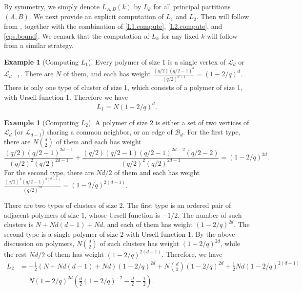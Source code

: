 \documentclass{amsart}
\theoremstyle{definition}
\newtheorem{example}[thm]{Example}
\newcommand{\cB}{\mathcal{B} }
\newcommand{\beq}[1]{\begin{equation}\label{#1}}
\newcommand{\enq}[0]{\end{equation}}
\newcommand{\0}[0]{\emptyset}
\begin{document}
By symmetry, we simply denote $L_{A, B}(k)$ by $L_k$ for all principal partitions $(A, B)$. We next provide an explicit computation of $L_1$ and $L_2$. Then  will follow from , together with the combination of \eqref{L1.compute}, \eqref{L2.compute}, and \eqref{eps.bound}. We remark that the computation of $L_k$ for any fixed $k$ will follow from a similar strategy.



\begin{example}[Computing $L_1$]
Every polymer of size 1 is a single vertex of $\mathcal{L}_d$ or $\mathcal{L}_{d-1}$. There are $N$ of them, and each has weight $\displaystyle \frac{(q/2)(q/2-1)^d}{(q/2)^{d+1}}=(1 - 2/q)^d$. There is only one type of cluster of size 1, which consists of a polymer of size 1, with Ursell function 1. Therefore we have 
\beq{L1.compute} L_1=N(1 - 2/q)^d.\enq
\end{example}

\begin{example}[Computing $L_2$]
A polymer of size 2 is either a set of two vertices of $\mathcal{L}_d$ (or $\mathcal{L}_{d-1}$) sharing a common neighbor, or an edge of $\cB_d$.
For the first type, there are $N\binom{d}{2}$ of them and each has weight 
\[\frac{(q/2)(q/2-1)^{2d-1}}{(q/2)^2(q/2)^{2d-1}} + \frac{(q/2)(q/2-1)(q/2-1)^{2d-2}(q/2-2)}{(q/2)^2(q/2)^{2d-1}}=(1 - 2/q)^{2d}. \]
For the second type, there are $Nd/2$ of them and each has weight $\displaystyle \frac{(q/2)^2(q/2-1)^{2(d-1)}}{(q/2)^{2d}}=(1 - 2/q)^{2(d-1)}$.

There are two types of clusters of size 2. The first type is an ordered pair of adjacent polymers of size 1, whose Ursell function is $-1/2$. The number of such clusters is $N+Nd(d-1) + Nd$, and each of them has weight $(1 - 2/q)^{2d}$.
The second type is a single polymer of size 2 with Ursell function 1. By the above discussion on polymers, $N\binom{d}{2}$ of such clusters has weight $(1 - 2/q)^{2d}$, while the rest $Nd/2$ of them has weight $(1 - 2/q)^{2(d-1)}$.
Therefore, we have
\beq{L2.compute}
\begin{split}
L_2&=-\frac12(N+Nd(d-1) + Nd)(1 - 2/q)^{2d} + N\binom{d}{2}(1 - 2/q)^{2d} + \frac{1}{2}Nd(1 - 2/q)^{2(d-1)}\\
&=N(1 - 2/q)^{2d}\left(\frac{d}{2}(1 - 2/q)^{-2} - \frac{d}{2}-\frac12\right).
\end{split}
\enq
\end{example}
\end{document}
